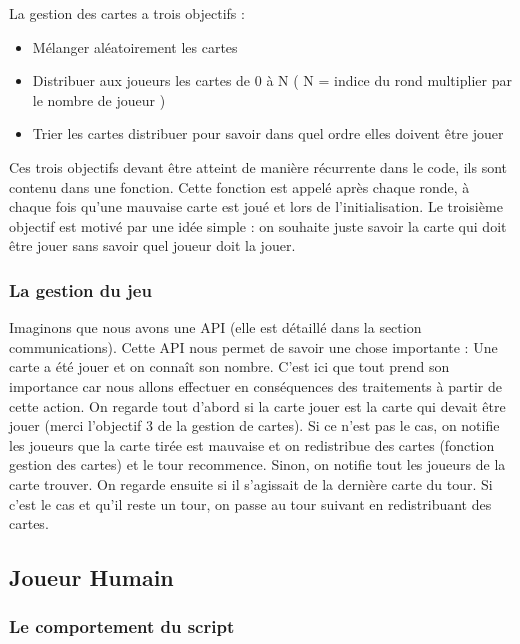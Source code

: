 \documentclass{article}
\begin{document}
La gestion des cartes a trois objectifs :

\begin{itemize}
	\item Mélanger aléatoirement les cartes
	\item Distribuer aux joueurs les cartes de 0 à N ( N = indice du rond multiplier par le nombre de joueur )
	\item Trier les cartes distribuer pour savoir dans quel ordre elles doivent être jouer
\end{itemize}

Ces trois objectifs devant être atteint de manière récurrente dans le code, ils sont contenu dans une fonction. Cette fonction est appelé après chaque ronde, à chaque fois qu'une mauvaise carte est joué et lors de l'initialisation. 
\newline
\newline
Le troisième objectif est motivé par une idée simple : on souhaite juste savoir la carte qui doit être jouer sans savoir quel joueur doit la jouer. 

\subsubsection{La gestion du jeu}

Imaginons que nous avons une API (elle est détaillé dans la section communications). Cette API nous permet de savoir une chose importante : 
Une carte a été jouer et on connaît son nombre. C'est ici que tout prend son importance car nous allons effectuer en conséquences des traitements à partir de cette action.\newline
On regarde tout d'abord si la carte jouer est la carte qui devait être jouer (merci l'objectif 3 de la gestion de cartes). Si ce n'est pas le cas, on notifie les joueurs que la carte tirée est mauvaise et on redistribue des cartes (fonction gestion des cartes) et le tour recommence. Sinon, on notifie tout les joueurs de la carte trouver. On regarde ensuite si il s'agissait de la dernière carte du tour. Si c'est le cas et qu'il reste un tour, on passe au tour suivant en redistribuant des cartes. 

\subsection{Joueur Humain}
\subsubsection{Le comportement du script}
\end{document}
